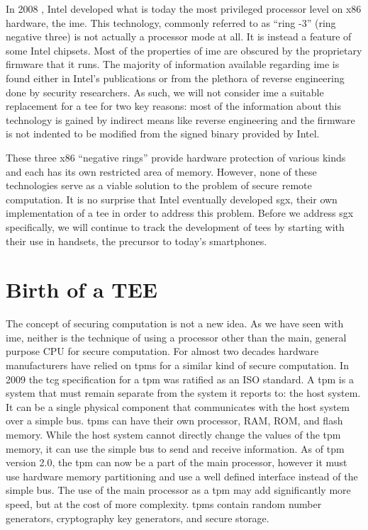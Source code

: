 In 2008 \cite{eldar2008configuring}, Intel developed what is today the most privileged processor level on x86 hardware, the \gls{ime}. This technology, commonly referred to as ``\gls{ring} -3'' (\gls{ring} negative three) is not actually a processor mode at all. It is instead a feature of some Intel chipsets. Most of the properties of \gls{ime} are obscured by the proprietary firmware that it runs. The majority of information available regarding \gls{ime} is found either in Intel's publications or from the plethora of reverse engineering done by security researchers. As such, we will not consider \gls{ime} a suitable replacement for a \gls{tee} for two key reasons: most of the information about this technology is gained by indirect means like reverse engineering and the firmware is not indented to be modified from the signed binary provided by Intel. 

These three x86 ``negative \glspl{ring}'' provide hardware protection of various kinds and each has its own restricted area of memory. However, none of these technologies serve as a viable solution to the problem of secure remote computation. It is no surprise that Intel eventually developed \gls{sgx}, their own implementation of a \gls{tee} in order to address this problem. Before we address \gls{sgx} specifically, we will continue to track the development of \glspl{tee} by starting with their use in handsets, the precursor to today's smartphones.

\section{Birth of a TEE}

The concept of securing computation is not a new idea. As we have seen with \gls{ime}, neither is the technique of using a processor other than the main, general purpose CPU for secure computation. For almost two decades \cite{osborn2013trusted} hardware manufacturers have relied on \glspl{tpm} for a similar kind of secure computation. In 2009 the \gls{tcg} specification for a \gls{tpm} was ratified as an ISO standard. A \gls{tpm} is a system that must remain separate from the system it reports to: the host system. It can be a single physical component that communicates with the host system over a simple bus. \glspl{tpm} can have their own processor, RAM, ROM, and flash memory. While the host system cannot directly change the values of the \gls{tpm} memory, it can use the simple bus to send and receive information. As of \gls{tpm} version 2.0, the \gls{tpm} can now be a part of the main processor, however it must use hardware memory partitioning and use a well defined interface instead of the simple bus. The use of the main processor as a \gls{tpm} may add significantly more speed, but at the cost of more complexity. \glspl{tpm} contain random number generators, cryptography key generators, and secure storage.

